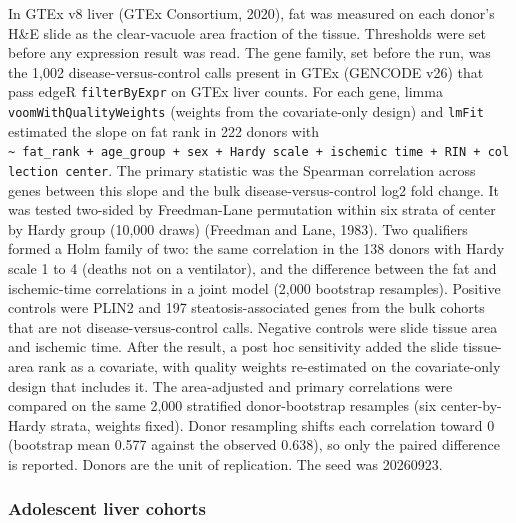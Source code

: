 In GTEx v8 liver (GTEx Consortium, 2020), fat was measured on each donor's H\&E slide as the clear-vacuole area fraction of the tissue. Thresholds were set before any expression result was read. The gene family, set before the run, was the 1,002 disease-versus-control calls present in GTEx (GENCODE v26) that pass edgeR \texttt{filterByExpr} on GTEx liver counts. For each gene, limma \texttt{voomWithQualityWeights} (weights from the covariate-only design) and \texttt{lmFit} estimated the slope on fat rank in 222 donors with \texttt{\textasciitilde{}\ fat\_\allowbreak{}rank\ +\ age\_\allowbreak{}group\ +\ sex\ +\ Hardy\ scale\ +\ ischemic\ time\ +\ RIN\ +\ collection\ center}. The primary statistic was the Spearman correlation across genes between this slope and the bulk disease-versus-control log2 fold change. It was tested two-sided by Freedman-Lane permutation within six strata of center by Hardy group (10,000 draws) (Freedman and Lane, 1983). Two qualifiers formed a Holm family of two: the same correlation in the 138 donors with Hardy scale 1 to 4 (deaths not on a ventilator), and the difference between the fat and ischemic-time correlations in a joint model (2,000 bootstrap resamples). Positive controls were PLIN2 and 197 steatosis-associated genes from the bulk cohorts that are not disease-versus-control calls. Negative controls were slide tissue area and ischemic time. After the result, a post hoc sensitivity added the slide tissue-area rank as a covariate, with quality weights re-estimated on the covariate-only design that includes it. The area-adjusted and primary correlations were compared on the same 2,000 stratified donor-bootstrap resamples (six center-by-Hardy strata, weights fixed). Donor resampling shifts each correlation toward 0 (bootstrap mean 0.577 against the observed 0.638), so only the paired difference is reported. Donors are the unit of replication. The seed was 20260923.

\subsubsection{Adolescent liver cohorts}\label{adolescent-liver-cohorts}

